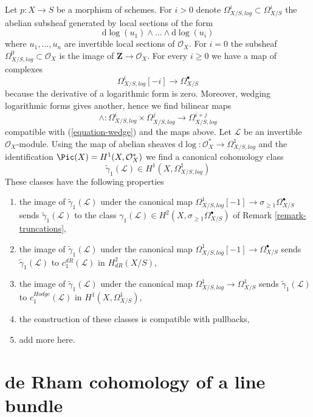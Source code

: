 \begin{remark}
\label{remark-log-forms}
Let $p : X \to S$ be a morphism of schemes. For $i > 0$
denote $\Omega^i_{X/S, log} \subset \Omega^i_{X/S}$ the abelian subsheaf
generated by local sections of the form
$$
\text{d}\log(u_1) \wedge \ldots \wedge \text{d}\log(u_i)
$$
where $u_1, \ldots, u_n$ are invertible local sections of $\mathcal{O}_X$.
For $i = 0$ the subsheaf $\Omega^0_{X/S, log} \subset \mathcal{O}_X$
is the image of $\mathbf{Z} \to \mathcal{O}_X$. For every $i \geq 0$ we
have a map of complexes
$$
\Omega^i_{X/S, log}[-i] \longrightarrow \Omega^\bullet_{X/S}
$$
because the derivative of a logarithmic form is zero. Moreover, wedging
logarithmic forms gives another, hence we find bilinear maps
$$
\wedge :  \Omega^i_{X/S, log} \times
\Omega^j_{X/S, log} \longrightarrow \Omega^{i + j}_{X/S, log}
$$
compatible with (\ref{equation-wedge}) and the maps above.
Let $\mathcal{L}$ be an invertible $\mathcal{O}_X$-module.
Using the map of abelian sheaves
$\text{d}\log : \mathcal{O}_X^* \to \Omega^1_{X/S, log}$
and the identification $\Pic(X) = H^1(X, \mathcal{O}_X^*)$
we find a canonical cohomology class
$$
\tilde \gamma_1(\mathcal{L}) \in H^1(X, \Omega^1_{X/S, log})
$$
These classes have the following properties
\begin{enumerate}
\item the image of $\tilde \gamma_1(\mathcal{L})$ under the canonical
map $\Omega^1_{X/S, log}[-1] \to \sigma_{\geq 1}\Omega^\bullet_{X/S}$
sends $\tilde \gamma_1(\mathcal{L})$ to the class
$\gamma_1(\mathcal{L}) \in 
H^2(X, \sigma_{\geq 1}\Omega^\bullet_{X/S})$
of Remark \ref{remark-truncations},
\item the image of $\tilde \gamma_1(\mathcal{L})$ under the canonical
map $\Omega^1_{X/S, log}[-1] \to \Omega^\bullet_{X/S}$
sends $\tilde \gamma_1(\mathcal{L})$ to $c_1^{dR}(\mathcal{L})$ in
$H^2_{dR}(X/S)$,
\item the image of $\tilde \gamma_1(\mathcal{L})$ under the canonical
map $\Omega^1_{X/S, log} \to \Omega^1_{X/S}$
sends $\tilde \gamma_1(\mathcal{L})$ to $c_1^{Hodge}(\mathcal{L})$ in
$H^1(X, \Omega^1_{X/S})$,
\item the construction of these classes is compatible with pullbacks,
\item add more here.
\end{enumerate}
\end{remark}





\section{de Rham cohomology of a line bundle}
\label{section-line-bundle}

